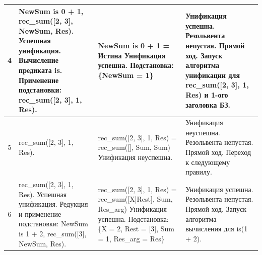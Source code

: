 \begin{tabularx}{\textwidth}{|c|>{\small}X|>{\small}X|>{\small}X|}
	4                                                                                  &
	NewSum is 0 + 1, \newline
	rec\_sum([2, 3], NewSum, Res). \newline
	Успешная унификация. \newline
	Вычисление предиката is. \newline
	Применение подстановки: \newline
	rec\_sum([2, 3], 1, Res).                                                          &
	NewSum is 0 + 1 = \newline
	Истина \newline
	Унификация успешна. \newline
	Подстановка: \newline
	\{NewSum = 1\}                                                                     &
	Унификация успешна. \newline
	Резольвента непустая. \newline
	Прямой ход. \newline
	Запуск алгоритма унификации для rec\_sum([2, 3], 1, Res) и 1-ого заголовка БЗ.       \\
	\hline

	5                                                                                  &
	rec\_sum([2, 3], 1, Res).                                                          &
	rec\_sum([2, 3], 1, Res) = \newline
	rec\_sum([], Sum, Sum) \newline
	Унификация неуспешна.                                                              &
	Унификация неуспешна. \newline
	Резольвента непустая. \newline
	Прямой ход. Переход к следующему правилу.                                            \\
	\hline

	6                                                                                  &
	rec\_sum([2, 3], 1, Res). \newline
	Успешная унификация. \newline
	Редукция и применение подстановки: \newline
	NewSum is 1 + 2, \newline
	rec\_sum([3], NewSum, Res).                                                        &
	rec\_sum([2, 3], 1, Res) = \newline
	rec\_sum([X|Rest], Sum, Res\_arg) \newline
	Унификация успешна. \newline
	Подстановка: \newline
	\{X = 2, Rest = [3], Sum = 1, Res\_arg = Res\}                                     &
	Унификация успешна. \newline
	Резольвента непустая. \newline
	Прямой ход. \newline
	Запуск алгоритма вычисления для is(1 + 2).                                           \\
	\hline


\end{tabularx}
